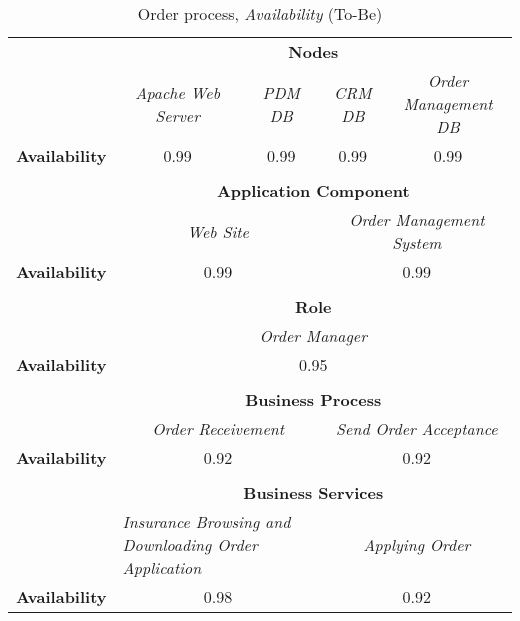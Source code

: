 \begin{table}[H]
	\centering
	\begin{tabular}{|c|c|p{2cm}|p{2.5cm}|p{2.5cm}|p{2.5cm}|}
		\cline{3-6}

		\multicolumn{2}{c}{} & \multicolumn{4}{|c|}{\textbf{Nodes}} \\ \cline{3-6}
		\multicolumn{2}{c|}{} & \multicolumn{1}{c|}{\textsl{Apache Web Server}} & \multicolumn{1}{c|}{\textsl{PDM DB}} & \multicolumn{1}{c|}{\textsl{CRM DB}} & \multicolumn{1}{c|}{\textsl{Order Management DB}} \\
		\hline
		\multicolumn{2}{|c|}{\textbf{Availability}}  & \multicolumn{1}{c|}{0.99} & \multicolumn{1}{c|}{0.99} & \multicolumn{1}{c|}{0.99} & \multicolumn{1}{c|}{0.99} \\ \hline
		
		\multicolumn{6}{c}{} \\ \cline{3-6}
		\multicolumn{2}{c}{} & \multicolumn{4}{|c|}{\textbf{Application Component}} \\ \cline{3-6}
		\multicolumn{2}{c|}{} & \multicolumn{2}{c|}{\textsl{Web Site}} & \multicolumn{2}{c|}{\textsl{Order Management System}} \\
		\hline
		\multicolumn{2}{|c|}{\textbf{Availability}} & \multicolumn{2}{c|}{0.99} & \multicolumn{2}{c|}{0.99}  \\ \hline
		
		\multicolumn{6}{c}{} \\ \cline{3-6}
		\multicolumn{2}{c}{} & \multicolumn{4}{|c|}{\textbf{Role}} \\ \cline{3-6}
		\multicolumn{2}{c|}{} & \multicolumn{4}{c|}{\textsl{Order Manager}} \\
		\hline
		\multicolumn{2}{|c|}{\textbf{Availability}}  & \multicolumn{4}{c|}{0.95}  \\ \hline

		\multicolumn{6}{c}{} \\ \cline{3-6}
		\multicolumn{2}{c}{} & \multicolumn{4}{|c|}{\textbf{Business Process}} \\ \cline{3-6}
		\multicolumn{2}{c|}{} & \multicolumn{2}{c|}{\textsl{Order Receivement}} & \multicolumn{2}{c|}{\textsl{Send Order Acceptance}} \\
		\hline
		\multicolumn{2}{|c|}{\textbf{Availability}} & \multicolumn{2}{c|}{0.92} & \multicolumn{2}{c|}{0.92} \\ \hline

		\multicolumn{6}{c}{} \\ \cline{3-6}
		\multicolumn{2}{c}{} & \multicolumn{4}{|c|}{\textbf{Business Services}} \\ \cline{3-6}
		\multicolumn{2}{c|}{} & \multicolumn{2}{p{5cm}|}{\textsl{Insurance Browsing and Downloading Order Application}} & \multicolumn{2}{c|}{\textsl{Applying Order}}  \\
		\hline
		\multicolumn{2}{|c|}{\textbf{Availability}}  & \multicolumn{2}{c|}{0.98} & \multicolumn{2}{c|}{0.92}\\ \hline
	\end{tabular}
\caption{Order process, \textsl{Availability} (To-Be)} 
\label{tab:order_as_is}
\end{table}